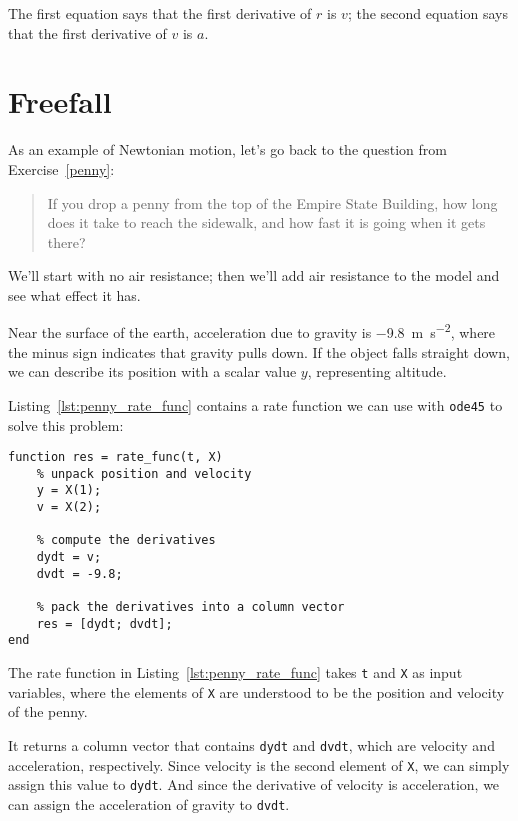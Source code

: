 The first equation says that the first derivative of $r$ is $v$;
the second equation says that the first derivative of $v$ is $a$.


\section{Freefall}
\label{freefall}

As an example of Newtonian motion, let's go back to the question from Exercise~\ref{penny}:

\begin{quote}
If you drop a penny from the top of the Empire State Building, how long does it take to reach the sidewalk, and how fast it is going when it gets there?
\end{quote}

We'll start with no air resistance; then we'll add air resistance to the model and see what effect it has.


Near the surface of the earth,
acceleration due to gravity is \SI{-9.8}{\meter \per \second \squared}, where the minus sign
indicates that gravity pulls down.
If the object falls straight down, we can describe its position with a
scalar value $y$, representing altitude.

Listing~\ref{lst:penny_rate_func} contains a rate function we can use with {\tt ode45} to solve
this problem:

\begin{lstlisting}[caption={A rate function for the falling penny problem}, label={lst:penny_rate_func}]
function res = rate_func(t, X)
    % unpack position and velocity
    y = X(1);      
    v = X(2);      
    
    % compute the derivatives
    dydt = v;
    dvdt = -9.8;

    % pack the derivatives into a column vector
    res = [dydt; dvdt];
end
\end{lstlisting}

The rate function in Listing~\ref{lst:penny_rate_func} takes {\tt t} and {\tt X} as input variables, where the elements of {\tt X} are understood to be the position and velocity of the penny.

It returns a column vector that contains {\tt dydt} and {\tt dvdt}, which
are velocity and acceleration, respectively.
Since velocity is the second element of {\tt X}, we can simply assign this value to {\tt dydt}.
And since the derivative of velocity is acceleration, we can assign the acceleration of gravity to {\tt dvdt}.

